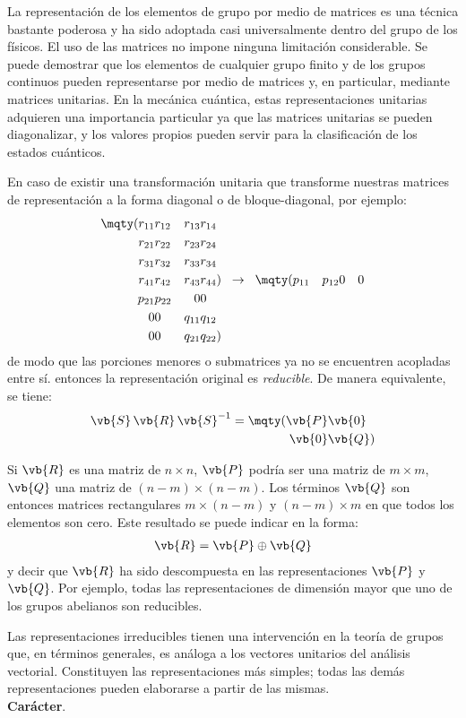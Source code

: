La representación de los elementos de grupo por medio de matrices es una técnica bastante poderosa y ha sido adoptada casi universalmente dentro del grupo de los físicos. El uso de las matrices no impone ninguna limitación considerable. Se puede demostrar que los elementos de cualquier grupo finito y de los grupos continuos pueden representarse por medio de matrices y, en particular, mediante matrices unitarias. En la mecánica cuántica, estas representaciones unitarias adquieren una importancia particular ya que las matrices unitarias se pueden diagonalizar, y los valores propios pueden servir para la clasificación de los estados cuánticos.
\par
En caso de existir una transformación unitaria que transforme nuestras matrices de representación a la forma diagonal o de bloque-diagonal, por ejemplo:
\begin{align}
\mqty(
r_{11} & r_{12} & r_{13} & r_{14} \\
r_{21} & r_{22} & r_{23} & r_{24} \\
r_{31} & r_{32} & r_{33} & r_{34} \\
r_{41} & r_{42} & r_{43} & r_{44} ) \hspace{0.2cm} \to \hspace{0.2cm} \mqty(
p_{11} & p_{12} & 0 & 0 \\
p_{21} & p_{22} & 0 & 0 \\
0 & 0 & q_{11} & q_{12} \\
0 & 0 & q_{21} & q_{22} )
\label{eq:ecucion_04_186}
\end{align}
de modo que las porciones menores o submatrices ya no se encuentren
acopladas entre sí. entonces la representación original es \emph{reducible}. De manera equivalente, se tiene:
\begin{align}
\vb{S} \, \vb{R} \, \vb{S}^{-1} = \mqty( 
\vb{P} & \vb{0} \\
\vb{0} & \vb{Q} )
\label{eq:ecuacion_04_187}
\end{align}

Si $\vb{R}$ es una matriz de $n \times n$, $\vb{P}$ podría ser una matriz de $m \times m$, $\vb{Q}$ una matriz de $(n-m) \times (n - m)$. Los términos $\vb{Q}$ son entonces matrices rectangulares $m \times (n - m)$ y $(n - m) \times m$ en que todos los elementos son cero. Este resultado se puede indicar en la forma:
\begin{align}
\vb{R} = \vb{P} \oplus \vb{Q}
\label{eq:ecuacion_04_188}
\end{align}
y decir que $\vb{R}$ ha sido descompuesta en las representaciones $\vb{P}$ y $\vb{Q}$. Por ejemplo, todas las representaciones de dimensión mayor que uno de los grupos abelianos son reducibles. 
\par
Las representaciones irreducibles tienen una intervención en la teoría
de grupos que, en términos generales, es análoga a los vectores unitarios del análisis vectorial. Constituyen las representaciones más simples; todas las demás representaciones pueden elaborarse a partir de las mismas.
\\[1em]
\noindent
\textbf{Carácter}.

